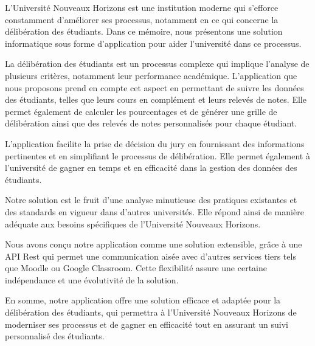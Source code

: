 L'Université Nouveaux Horizons est une institution moderne qui s'efforce constamment d'améliorer ses processus, notamment en ce qui concerne la délibération des étudiants. Dans ce mémoire, nous présentons une solution informatique sous forme d'application pour aider l'université dans ce processus.

La délibération des étudiants est un processus complexe qui implique l'analyse de plusieurs critères, notamment leur performance académique. L'application que nous proposons prend en compte cet aspect en permettant de suivre les données des étudiants, telles que leurs cours en complément et leurs relevés de notes. Elle permet également de calculer les pourcentages et de générer une grille de délibération ainsi que des relevés de notes personnalisés pour chaque étudiant.

L'application facilite la prise de décision du jury en fournissant des informations pertinentes et en simplifiant le processus de délibération. Elle permet également à l'université de gagner en temps et en efficacité dans la gestion des données des étudiants.

Notre solution est le fruit d'une analyse minutieuse des pratiques existantes et des standards en vigueur dans d'autres universités. Elle répond ainsi de manière adéquate aux besoins spécifiques de l'Université Nouveaux Horizons.

Nous avons conçu notre application comme une solution extensible, grâce à une API Rest qui permet une communication aisée avec d'autres services tiers tels que Moodle ou Google Classroom. Cette flexibilité assure une certaine indépendance et une évolutivité de la solution.

En somme, notre application offre une solution efficace et adaptée pour la délibération des étudiants, qui permettra à l'Université Nouveaux Horizons de moderniser ses processus et de gagner en efficacité tout en assurant un suivi personnalisé des étudiants.